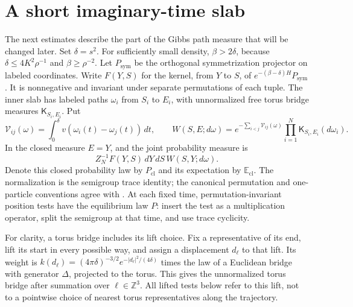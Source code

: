 \section{A short imaginary-time slab}\label{sec:slab}

The next estimates describe the part of the Gibbs path measure that
will be changed later. Set $\delta=s^2$. For sufficiently small
density, $\beta>2\delta$, because
$\delta\leq4K^2\rho^{-1}$ and $\beta\geq\rho^{-2}$.
Let $P_{\mathrm{sym}}$ be the orthogonal symmetrization projector
on labeled coordinates. Write $F(Y,S)$ for the kernel, from $Y$
to $S$, of $e^{-(\beta-\delta)H}P_{\mathrm{sym}}$.
It is nonnegative and invariant under separate permutations of
each tuple. The inner slab has labeled paths $\omega_i$ from
$S_i$ to $E_i$, with unnormalized free torus bridge measures
$\mathsf K_{S_i,E_i}$. Put
\[
 \mathcal V_{ij}(\omega)=\int_0^\delta
 v(\omega_i(t)-\omega_j(t))\,dt,\qquad
 W(S,E;d\omega)=e^{-\sum_{i<j}\mathcal V_{ij}(\omega)}
 \prod_{i=1}^N\mathsf K_{S_i,E_i}(d\omega_i).
\]
In the closed measure $E=Y$, and the joint probability measure is
\begin{equation}
 Z_N^{-1}F(Y,S)\,dY\,dS\,W(S,Y;d\omega).
 \tag{14}\label{eq:14}
\end{equation}
Denote this closed probability law by $P_{\mathrm{cl}}$ and its
expectation by $\mathbb E_{\mathrm{cl}}$.
The normalization is the semigroup trace identity; the canonical
permutation and one-particle conventions agree with
\cite[Appendix~A, (A.1), (A.8)--(A.10), and (A.12)--(A.18)]{Ueltschi2006FeynmanCycles}. At each fixed
time, permutation-invariant position tests have the equilibrium
law $P$: insert the test as a multiplication operator, split the
semigroup at that time, and use trace cyclicity.

For clarity, a torus bridge includes its lift choice. Fix a
representative of its end, lift its start in every possible way,
and assign a displacement $d_\ell$ to that lift. Its weight is
$k(d_\ell)=(4\pi\delta)^{-3/2}e^{-|d_\ell|^2/(4\delta)}$
times the law of a Euclidean bridge with generator $\Delta$,
projected to the torus. This gives the unnormalized torus bridge
after summation over $\ell\in\mathbb Z^3$. All lifted tests below
refer to this lift, not to a pointwise choice of nearest torus
representatives along the trajectory.

